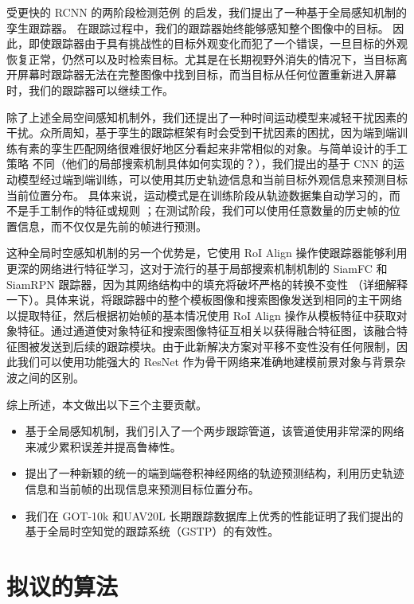 受更快的 RCNN 的两阶段检测范例 \cite{ren2015faster} 的启发，我们提出了一种基于全局感知机制的孪生跟踪器。
在跟踪过程中，我们的跟踪器始终能够感知整个图像中的目标。
因此，即使跟踪器由于具有挑战性的目标外观变化而犯了一个错误，一旦目标的外观恢复正常，仍然可以及时检索目标。尤其是在长期视野外消失的情况下，当目标离开屏幕时跟踪器无法在完整图像中找到目标，而当目标从任何位置重新进入屏幕时，我们的跟踪器可以继续工作。

除了上述全局空间感知机制外，我们还提出了一种时间运动模型来减轻干扰因素的干扰。众所周知，基于孪生的跟踪框架有时会受到干扰因素的困扰，因为端到端训练有素的孪生匹配网络很难很好地区分看起来非常相似的对象。与简单设计的手工策略 \cite{SiamFC, SiamRPN} 不同（他们的局部搜索机制具体如何实现的？），我们提出的基于 CNN 的运动模型经过端到端训练，可以使用其历史轨迹信息和当前目标外观信息来预测目标当前位置分布。
具体来说，运动模式是在训练阶段从轨迹数据集自动学习的，而不是手工制作的特征或规则 \cite{iswanto2017visual}；在测试阶段，我们可以使用任意数量的历史帧的位置信息，而不仅仅是先前的帧进行预测。

这种全局时空感知机制的另一个优势是，它使用 RoI Align \cite{He2018MaskR} 操作使跟踪器能够利用更深的网络进行特征学习，这对于流行的基于局部搜索机制机制的 SiamFC \cite{SiamFC} 和 SiamRPN \cite{SiamRPN} 跟踪器，因为其网络结构中的填充将破坏严格的转换不变性 \cite{SiamRPN++}（详细解释一下）。具体来说，将跟踪器中的整个模板图像和搜索图像发送到相同的主干网络以提取特征，然后根据初始帧的基本情况使用 RoI Align 操作从模板特征中获取对象特征。通过通道使对象特征和搜索图像特征互相关以获得融合特征图，该融合特征图被发送到后续的跟踪模块。由于此新解决方案对平移不变性没有任何限制，因此我们可以使用功能强大的 ResNet \cite{he2016deep} 作为骨干网络来准确地建模前景对象与背景杂波之间的区别。

综上所述，本文做出以下三个主要贡献。
\begin{itemize}
\item 基于全局感知机制，我们引入了一个两步跟踪管道，该管道使用非常深的网络来减少累积误差并提高鲁棒性。
\item 提出了一种新颖的统一的端到端卷积神经网络的轨迹预测结构，利用历史轨迹信息和当前帧的出现信息来预测目标位置分布。
\item 我们在 GOT-10k \cite{GOT-10k} 和UAV20L \cite{mueller2016benchmark} 长期跟踪数据库上优秀的性能证明了我们提出的基于全局时空知觉的跟踪系统（GSTP）的有效性。
\end{itemize}

\section{拟议的算法}
\label{sec:method}

